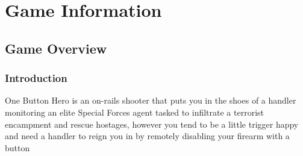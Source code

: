 \documentclass[11pt,fleqn]{book} %
\begin{document}




\pagestyle{empty} %

\tableofcontents %

\cleardoublepage %

\pagestyle{fancy} %


\part{Game Information}



\chapter{Game Overview}

\section{Introduction}

One Button Hero is an on-rails shooter that puts you in the shoes of a handler monitoring an elite Special Forces agent tasked to infiltrate a terrorist encampment and rescue hostages, however you tend to be a little trigger happy and need a handler to reign you in by remotely disabling your firearm with a button
\vspace{-\baselineskip}
\end{document}
